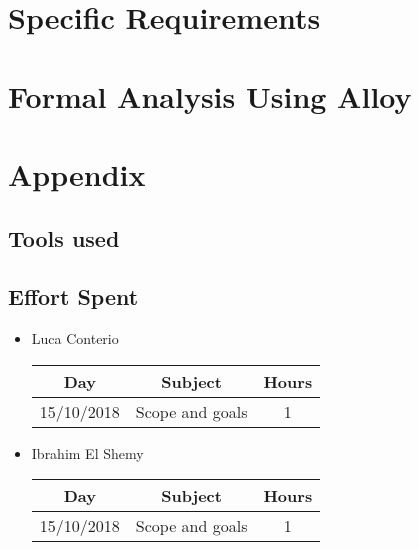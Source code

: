 \documentclass[12pt,a4paper]{article}
\begin{document}
	\newpage
	\section{Specific Requirements}
	
	\newpage
	\section{Formal Analysis Using Alloy}

	\newpage
	\section{Appendix}
	\subsection{Tools used}
	
	\subsection{Effort Spent}
		\begin{itemize}
			\item Luca Conterio
			\begin{center}
				\begin{tabular}{| c | c | c |}
					\hline
					Day & Subject & Hours \\ \hline
					15/10/2018 & Scope and goals & 1 \\
					\hline
				\end{tabular}
			\end{center}
		
			\item Ibrahim El Shemy
			\begin{center}
				\begin{tabular}{| c | c | c |}
					\hline
					Day & Subject & Hours \\ \hline
					15/10/2018 & Scope and goals & 1 \\
					\hline
				\end{tabular}
			\end{center}
		\end{itemize}
	
\end{document}
